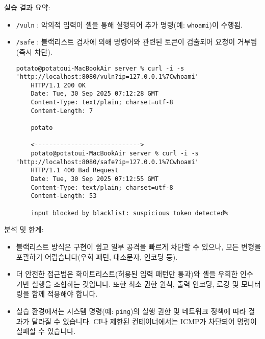 \documentclass{article}
\begin{document}
실습 결과 요약:
\begin{itemize}
	\item \texttt{/vuln} : 악의적 입력이 셸을 통해 실행되어 추가 명령(예: \texttt{whoami})이 수행됨.
	\item \texttt{/safe} : 블랙리스트 검사에 의해 명령어와 관련된 토큰이 검출되어 요청이 거부됨(즉시 차단).
    \begin{lstlisting}[caption={실험 결과}, label={lst:result}]
    potato@potatoui-MacBookAir server % curl -i -s 'http://localhost:8080/vuln?ip=127.0.0.1%7Cwhoami'
    HTTP/1.1 200 OK
    Date: Tue, 30 Sep 2025 07:12:28 GMT
    Content-Type: text/plain; charset=utf-8
    Content-Length: 7

    potato

    <----------------------------->
    potato@potatoui-MacBookAir server % curl -i -s 'http://localhost:8080/safe?ip=127.0.0.1%7Cwhoami'
    HTTP/1.1 400 Bad Request
    Date: Tue, 30 Sep 2025 07:12:55 GMT
    Content-Type: text/plain; charset=utf-8
    Content-Length: 53

    input blocked by blacklist: suspicious token detected%  
    \end{lstlisting}
\end{itemize}


분석 및 한계:
\begin{itemize}
	\item 블랙리스트 방식은 구현이 쉽고 일부 공격을 빠르게 차단할 수 있으나, 모든 변형을 포괄하기 어렵습니다(우회 패턴, 대소문자, 인코딩 등).
	\item 더 안전한 접근법은 화이트리스트(허용된 입력 패턴만 통과)와 셸을 우회한 인수 기반 실행을 조합하는 것입니다. 또한 최소 권한 원칙, 출력 인코딩, 로깅 및 모니터링을 함께 적용해야 합니다.
	\item 실습 환경에서는 시스템 명령(예: \texttt{ping})의 실행 권한 및 네트워크 정책에 따라 결과가 달라질 수 있습니다. CI나 제한된 컨테이너에서는 ICMP가 차단되어 명령이 실패할 수 있습니다.
\end{itemize}

\newpage
\appendix
\end{document}
